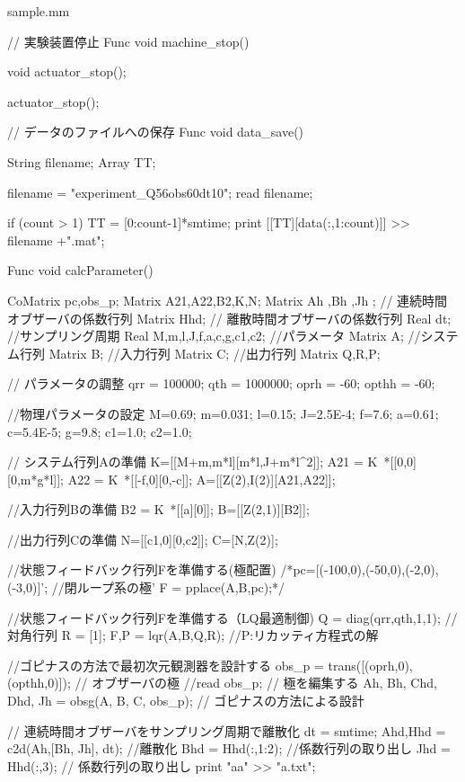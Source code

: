 \begin{breakitembox}[l]{sample.mm}
\begin{verbatimtab}[4]
// 実験装置停止
Func void machine_stop()
{
	void actuator_stop();

	actuator_stop();
}

// データのファイルへの保存
Func void data_save()
{
	String filename;
	Array TT;

	filename = "experiment_Q56obs60dt10";
	read filename;

	if (count > 1) {
		TT = [0:count-1]*smtime;
		print [[TT][data(:,1:count)]] >> filename +".mat";
	}
}

Func void calcParameter(){

    CoMatrix pc,obs_p;
    Matrix A21,A22,B2,K,N;
	Matrix Ah ,Bh ,Jh ; // 連続時間オブザーバの係数行列
	Matrix Hhd; // 離散時間オブザーバの係数行列
	Real dt; //サンプリング周期
	Real M,m,l,J,f,a,c,g,c1,c2; //パラメータ
	Matrix A; //システム行列
	Matrix B; //入力行列
	Matrix C; //出力行列
	Matrix Q,R,P;

    
	// パラメータの調整
	qrr = 100000;
	qth = 1000000;
	oprh = -60;
	opthh = -60;

    //物理パラメータの設定
	M=0.69;   m=0.031; l=0.15;
	J=2.5E-4; f=7.6; a=0.61;
	c=5.4E-5; g=9.8; c1=1.0;
	c2=1.0;

    // システム行列Aの準備
    K=[[M+m,m*l][m*l,J+m*l^2]];
	A21 = K~*[[0,0][0,m*g*l]];
	A22 = K~*[[-f,0][0,-c]];
	A=[[Z(2),I(2)][A21,A22]];

    //入力行列Bの準備
	B2 = K~*[[a][0]];
	B=[[Z(2,1)][B2]];

	//出力行列Cの準備
    N=[[c1,0][0,c2]];
    C=[N,Z(2)];

	//状態フィードバック行列Fを準備する(極配置)
    /*pc=[(-100,0),(-50,0),(-2,0),(-3,0)]'; //閉ループ系の極'
    F = pplace(A,B,pc);*/

    //状態フィードバック行列Fを準備する（LQ最適制御)
    Q = diag(qrr,qth,1,1); // 対角行列
    R = [1];
    {F,P} = lqr(A,B,Q,R); //P:リカッティ方程式の解

	//ゴピナスの方法で最初次元観測器を設計する
	obs_p = trans([(oprh,0), (opthh,0)]); // オブザーバの極
	//read obs_p; // 極を編集する
	{Ah, Bh, Chd, Dhd, Jh} = obsg(A, B, C, obs_p); // ゴピナスの方法による設計

	// 連続時間オブザーバをサンプリング周期で離散化
	dt = smtime;
	{Ahd,Hhd} = c2d(Ah,[Bh, Jh], dt); //離散化
	Bhd = Hhd(:,1:2); //係数行列の取り出し
	Jhd = Hhd(:,3); // 係数行列の取り出し
print "aa" >> "a.txt";

}

		\end{verbatimtab}
	\end{breakitembox}
